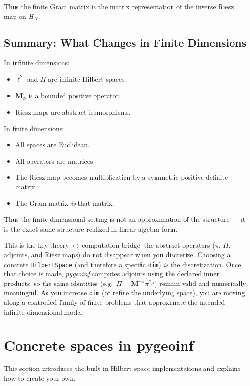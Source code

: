 \documentclass[11pt,twoside,openright]{book}
\theoremstyle{plain}
\theoremstyle{definition}
\theoremstyle{remark}
\begin{document}
Thus the finite Gram matrix is the matrix representation
of the inverse Riesz map on $H_N$.

\subsection{Summary: What Changes in Finite Dimensions}

In infinite dimensions:
\begin{itemize}
\item $\ell^2$ and $H$ are infinite Hilbert spaces.
\item $\mathbf{M}_\phi$ is a bounded positive operator.
\item Riesz maps are abstract isomorphisms.
\end{itemize}

In finite dimensions:
\begin{itemize}
\item All spaces are Euclidean.
\item All operators are matrices.
\item The Riesz map becomes multiplication by a symmetric positive definite matrix.
\item The Gram matrix \emph{is} that matrix.
\end{itemize}

Thus the finite-dimensional setting is not an approximation of the structure ---
it is the exact same structure realized in linear algebra form.

\begin{whybox}
This is the key theory\,$\leftrightarrow$\,computation bridge: the abstract operators
($\pi$, $\Pi$, adjoints, and Riesz maps) do not disappear when you discretize.
Choosing a concrete \texttt{HilbertSpace} (and therefore a specific \texttt{dim}) \emph{is} the discretization.
Once that choice is made, \textit{pygeoinf} computes adjoints using the declared inner products,
so the same identities (e.g.\ $\Pi = \mathbf{M}^{-1}\pi^{*_{\ell^2}}$) remain valid and numerically meaningful.
As you increase \texttt{dim} (or refine the underlying space), you are moving along a controlled family of finite problems that approximate the intended infinite-dimensional model.
\end{whybox}
\section{Concrete spaces in pygeoinf}
\label{sec:concrete-spaces}

This section introduces the built-in Hilbert space implementations and
explains how to create your own.
\end{document}
